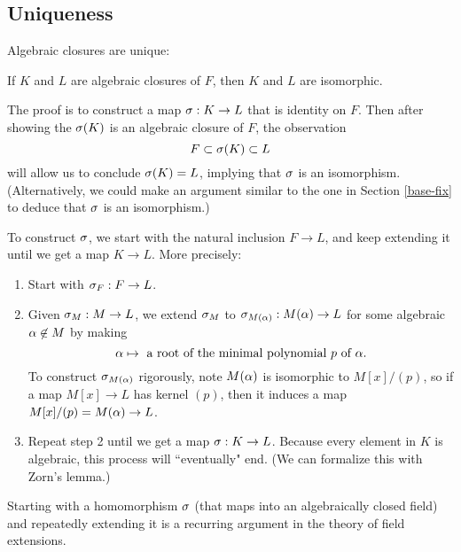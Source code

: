 \subsection{Uniqueness}
Algebraic closures are unique:
\begin{center}
    If $K$ and $L$ are algebraic closures of $F$, then $K$ and $L$ are isomorphic.
\end{center}
The proof is to construct a map $\sigma: K \rightarrow L$ that is identity on $F$. Then after showing the $\sigma(K)$ is an algebraic closure of $F$, the observation
\[
    F \subset \sigma(K) \subset L
\]
will allow us to conclude $\sigma(K) = L$, implying that $\sigma$ is an isomorphism. (Alternatively, we could make an argument similar to the one in Section \ref{base-fix} to deduce that $\sigma$ is an isomorphism.)

To construct $\sigma$, we start with the natural inclusion $F \rightarrow L$, and keep extending it until we get a map $K \rightarrow L$. More precisely:
\begin{enumerate}
    \item Start with $\sigma_F : F \rightarrow L$.
    \item Given $\sigma_M: M \rightarrow L$, we extend $\sigma_M$ to $\sigma_{M(\alpha)}: M(\alpha) \rightarrow L$ for some algebraic $\alpha \not \in M$ by making
        \[
            \alpha \mapsto \text{ a root of the minimal polynomial $p$ of $\alpha$.}
        \]
        To construct $\sigma_{M(\alpha)}$ rigorously, note $M(\alpha)$ is isomorphic to $M[x]/(p)$, so if a map $M[x] \rightarrow L$ has kernel $(p)$, then it induces a map $M[x]/(p) = M(\alpha) \rightarrow L$.
    \item Repeat step 2 until we get a map $\sigma: K \rightarrow L$. Because every element in $K$ is algebraic, this process will ``eventually" end. (We can formalize this with Zorn's lemma.)
\end{enumerate}

\begin{remark}
Starting with a homomorphism $\sigma$ (that maps into an algebraically closed field) and repeatedly extending it is a recurring argument in the theory of field extensions.
\end{remark}

